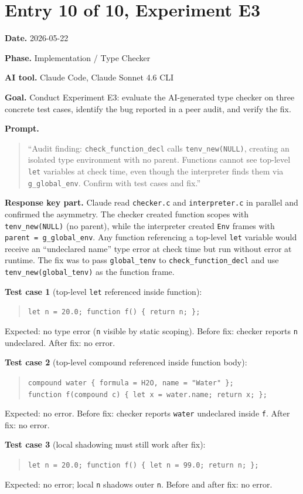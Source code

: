 \documentclass[11pt,a4paper]{article}
\newcommand{\code}[1]{\texttt{#1}}
\newcommand{\field}[2]{\textbf{#1.} #2\par}
\newcommand{\prompt}[1]{%
  \textbf{Prompt.}
  \begin{quote}\small #1\end{quote}
}
\begin{document}
\section{Entry 10 of 10, Experiment E3}
\field{Date}{2026-05-22}
\field{Phase}{Implementation / Type Checker}
\field{AI tool}{Claude Code, Claude Sonnet 4.6 CLI}
\field{Goal}{Conduct Experiment E3: evaluate the AI-generated type checker on three concrete test cases, identify the bug reported in a peer audit, and verify the fix.}
\prompt{``Audit finding: \texttt{check\_function\_decl} calls \texttt{tenv\_new(NULL)}, creating an isolated type environment with no parent. Functions cannot see top-level \texttt{let} variables at check time, even though the interpreter finds them via \texttt{g\_global\_env}. Confirm with test cases and fix.''}
\field{Response key part}{Claude read \texttt{checker.c} and \texttt{interpreter.c} in parallel and confirmed the asymmetry. The checker created function scopes with \texttt{tenv\_new(NULL)} (no parent), while the interpreter created \texttt{Env} frames with \texttt{parent = g\_global\_env}. Any function referencing a top-level \texttt{let} variable would receive an ``undeclared name'' type error at check time but run without error at runtime. The fix was to pass \texttt{global\_tenv} to \texttt{check\_function\_decl} and use \texttt{tenv\_new(global\_tenv)} as the function frame.}

\textbf{Test case 1} (top-level \texttt{let} referenced inside function):
\begin{quote}\small
\code{let n = 20.0; function f() \{ return n; \};}
\end{quote}
Expected: no type error (\texttt{n} visible by static scoping). Before fix: checker reports \texttt{n} undeclared. After fix: no error. \checkmark

\textbf{Test case 2} (top-level compound referenced inside function body):
\begin{quote}\small
\code{compound water \{ formula = H2O, name = "Water" \};}\\
\code{function f(compound c) \{ let x = water.name; return x; \};}
\end{quote}
Expected: no error. Before fix: checker reports \texttt{water} undeclared inside \texttt{f}. After fix: no error. \checkmark

\textbf{Test case 3} (local shadowing must still work after fix):
\begin{quote}\small
\code{let n = 20.0; function f() \{ let n = 99.0; return n; \};}
\end{quote}
Expected: no error; local \texttt{n} shadows outer \texttt{n}. Before and after fix: no error. \checkmark
\end{document}

